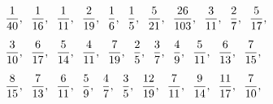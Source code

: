 \begin{align*}
&\frac{1}{40}, \text{\hspace{0.2cm}} \frac{ 1}{16}, \text{\hspace{0.2cm}} \frac{ 1}{11}, \text{\hspace{0.2cm}} \frac{ 2}{19}, \text{\hspace{0.2cm}} \frac{ 1}{6}, \text{\hspace{0.2cm}} \frac{ 1}{5}, \text{\hspace{0.2cm}} \frac{ 5}{21}, \text{\hspace{0.2cm}} \frac{ 26}{103}, \text{\hspace{0.2cm}} \frac{ 3}{11}, \text{\hspace{0.2cm}} \frac{ 2}{7}, \text{\hspace{0.2cm}} \frac{ 5}{17}, \text{\hspace{0.2cm}}\\[6pt]%
&\frac{3}{10}, \text{\hspace{0.2cm}} \frac{ 6}{17}, \text{\hspace{0.2cm}} \frac{ 5}{14}, \text{\hspace{0.2cm}} \frac{ 4}{11}, \text{\hspace{0.2cm}} \frac{ 7}{19}, \text{\hspace{0.2cm}} \frac{ 2}{5}, \text{\hspace{0.2cm}} \frac{ 3}{7}, \text{\hspace{0.2cm}} \frac{ 4}{9}, \text{\hspace{0.2cm}} \frac{ 5}{11}, \text{\hspace{0.2cm}} \frac{ 6}{13}, \text{\hspace{0.2cm}} \frac{ 7}{15}, \text{\hspace{0.2cm}}\\[6pt]%
&\frac{ 8}{15}, \text{\hspace{0.2cm}} \frac{7}{13}, \text{\hspace{0.2cm}} \frac{ 6}{11}, \text{\hspace{0.2cm}} \frac{ 5}{9}, \text{\hspace{0.2cm}} \frac{ 4}{7}, \text{\hspace{0.2cm}} \frac{ 3}{5}, \text{\hspace{0.2cm}} \frac{ 12}{19}, \text{\hspace{0.2cm}} \frac{ 7}{11}, \text{\hspace{0.2cm}} \frac{ 9}{14}, \text{\hspace{0.2cm}} \frac{ 11}{17}, \text{\hspace{0.2cm}} \frac{ 7}{10}, \text{\hspace{0.2cm}} \\[6pt]%

\end{align*}
